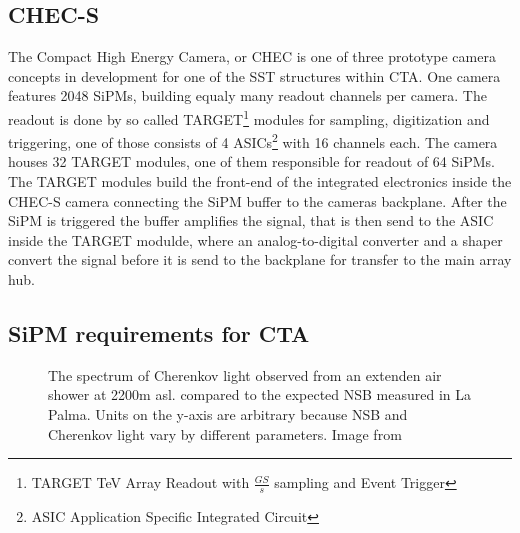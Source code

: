 \documentclass[12pt,article,type=msc,colorback,accentcolor=tud9c]{tudthesis}
\begin{document}
\subsection{CHEC-S}
The Compact High Energy Camera, or CHEC is one of three prototype camera concepts in development for one of the SST structures within CTA. One camera features 2048 SiPMs, building equaly many readout channels per camera. The readout is done by so called TARGET\footnote{TARGET TeV Array Readout with $\frac{GS}{s}$ sampling and Event Trigger} modules for sampling, digitization and triggering, one of those consists of 4 ASICs\footnote{ASIC Application Specific Integrated Circuit} with 16 channels each. The camera houses 32 TARGET modules, one of them responsible for readout of 64 SiPMs. The TARGET modules build the front-end of the integrated electronics inside the CHEC-S camera connecting the SiPM buffer to the cameras backplane. After the SiPM is triggered the buffer amplifies the signal, that is then send to the ASIC inside the TARGET modulde, where an analog-to-digital converter and a shaper convert the signal before it is send to the backplane for transfer to the main array hub. 

\subsection{SiPM requirements for CTA}
\begin{figure}[t]
\begin{centering}
\caption{The spectrum of Cherenkov light observed from an extenden air shower at 2200m asl. compared to the expected NSB measured in La Palma. Units on the y-axis are arbitrary because NSB and Cherenkov light vary by different parameters. Image from \cite{SiPMvsMAPMT}}
\label{fig:Cherenkov_NSB}
\end{centering}
\end{figure}
\end{document}
